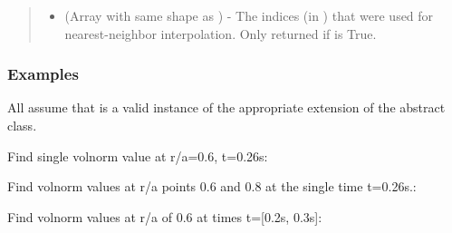 \documentclass[letterpaper,10pt,english]{sphinxmanual}
\begin{document}
\begin{fulllineitems}
\begin{fulllineitems}
\begin{quote}
\begin{description}
\begin{itemize}
\item {} 
 (Array with same shape as ) - The indices
(in ) that were used for
nearest-neighbor interpolation. Only returned if  is
True.

\end{itemize}


\end{description}\end{quote}
\subsubsection*{Examples}

All assume that  is a valid instance of the appropriate
extension of the {\hyperref[\detokenize{eqtools:eqtools.core.Equilibrium}]{}} abstract class.

Find single volnorm value at r/a=0.6, t=0.26s:

\begin{sphinxVerbatim}[commandchars=\\\{\}]
   
\end{sphinxVerbatim}

Find volnorm values at r/a points 0.6 and 0.8 at the
single time t=0.26s.:

\begin{sphinxVerbatim}[commandchars=\\\{\}]
  \PYG{p}{[} \PYG{p}{]} 
\end{sphinxVerbatim}

Find volnorm values at r/a of 0.6 at times t={[}0.2s, 0.3s{]}:

\begin{sphinxVerbatim}[commandchars=\\\{\}]
   \PYG{p}{[} \PYG{p}{]}
\end{sphinxVerbatim}


\end{fulllineitems}
\end{fulllineitems}
\end{document}
